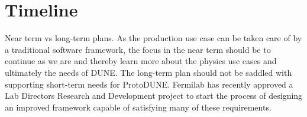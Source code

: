 \documentclass[../main-v1.tex]{subfiles}
\begin{document}
\section{Timeline}

Near term vs long-term plans.  As the production use case can be taken care of by a traditional software framework, the focus in the near term should be to continue as we are and thereby learn more about the physics use cases and ultimately the needs of DUNE.  The long-term plan should not be saddled with supporting short-term needs for ProtoDUNE.  Fermilab has recently approved a Lab Directors Research and Development project to start the process of designing an improved framework capable of satisfying many of these requirements. 







%
\end{document}
